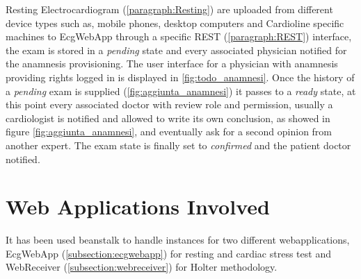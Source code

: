 Resting Electrocardiogram (\ref{paragraph:Resting}) are uploaded from different device types such as, mobile phones, desktop computers and Cardioline specific machines to EcgWebApp through a specific REST (\ref{paragraph:REST}) interface, the exam is stored in a \textit{pending} state and every associated physician notified for the anamnesis provisioning.
The user interface for a physician with anamnesis providing rights logged in is displayed in \ref{fig:todo_anamnesi}.
Once the history of a \textit{pending} exam is supplied (\ref{fig:aggiunta_anamnesi}) it passes to a \textit{ready} state, at this point every associated doctor with review role and permission, usually a cardiologist is notified and allowed to write its own conclusion, as showed in figure \ref{fig:aggiunta_anamnesi}, and eventually ask for a second opinion from another expert. The exam state is finally set to \textit{confirmed} and the patient doctor notified.

\section{Web Applications Involved}
It has been used beanstalk to handle instances for two different webapplications, EcgWebApp (\ref{subsection:ecgwebapp}) for resting and cardiac stress test and WebReceiver (\ref{subsection:webreceiver}) for Holter methodology.
